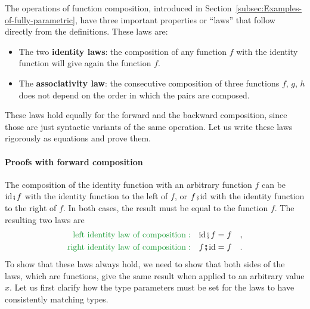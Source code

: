 The operations of function composition, introduced in Section~\ref{subsec:Examples-of-fully-parametric},
have three important properties or \textsf{``}laws\textsf{''} that follow directly
from the definitions. These laws are:
\begin{itemize}
\item The two \textbf{identity laws}:
the composition of any function $f$ with the identity function will
give again the function $f$.
\item The \textbf{associativity law}:
the consecutive composition of three functions $f$, $g$, $h$ does
not depend on the order in which the pairs are composed.
\end{itemize}
These laws hold equally for the forward and the backward composition,
since those are just syntactic variants of the same operation. Let
us write these laws rigorously as equations and prove them.

\paragraph{Proofs with forward composition}

The composition of the identity function with an arbitrary function
$f$ can be $\text{id}\bef f$ with the identity function to the left
of $f$, or $f\bef\text{id}$ with the identity function to the right
of $f$. In both cases, the result must be equal to the function $f$.
The resulting two laws are
\begin{align*}
{\color{greenunder}\text{left identity law of composition}:}\quad & \text{id}\bef f=f\quad,\\
{\color{greenunder}\text{right identity law of composition}:}\quad & f\bef\text{id}=f\quad.
\end{align*}
To show that these laws always hold, we need to show that both sides
of the laws, which are functions, give the same result when applied
to an arbitrary value $x$. Let us first clarify how the type parameters
must be set for the laws to have consistently matching types.


